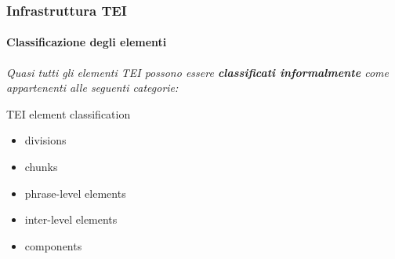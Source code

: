     








% 


\begin{frame}
    \frametitle{Infrastruttura TEI}
    \framesubtitle{Classificazione degli elementi}
    \addtocounter{nframe}{1}
    \textit{Quasi tutti gli elementi TEI possono essere \textbf{classificati informalmente} come appartenenti alle seguenti categorie:}
    \begin{block}{TEI element classification}
        \begin{itemize}
            \item divisions
            \item chunks
            \item phrase-level elements
            \item inter-level elements
            \item components
        \end{itemize}

    \end{block}

\end{frame}

